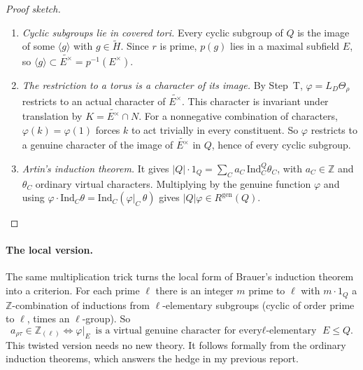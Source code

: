\documentclass[11pt]{article}
\newcommand{\tH}{\widetilde H}
\theoremstyle{plain}
\begin{document}
\begin{proof}[Proof sketch]
\begin{enumerate}[label=(\roman*)]
\item \emph{Cyclic subgroups lie in covered tori.} Every cyclic subgroup
of $Q$ is the image of some $\langle g\rangle$ with $g\in\tH$. Since $r$
is prime, $p(g)$ lies in a maximal subfield $E$, so
$\langle g\rangle\subset\widetilde{E^\times}=p^{-1}(E^\times)$.
\item \emph{The restriction to a torus is a character of its image.}
By Step~T, $\varphi=L_D\Theta_\rho$ restricts to an actual character of
$\widetilde{E^\times}$. This character is invariant under translation
by $K=\widetilde{E^\times}\cap N$. For a nonnegative combination of
characters, $\varphi(k)=\varphi(1)$ forces $k$ to act trivially in
every constituent. So $\varphi$ restricts to a genuine character of the
image of $\widetilde{E^\times}$ in $Q$, hence of every cyclic subgroup.
\item \emph{Artin's induction theorem.} It gives
$|Q|\cdot1_Q=\sum_Ca_C\,\mathrm{Ind}_C^Q\theta_C$, with $a_C\in\mathbb Z$
and $\theta_C$ ordinary virtual characters. Multiplying by the genuine
function $\varphi$ and using
$\varphi\cdot\mathrm{Ind}_C\theta=\mathrm{Ind}_C(\varphi|_C\,\theta)$
gives $|Q|\varphi\in R^{\mathrm{gen}}(Q)$.
\end{enumerate}
\end{proof}

\paragraph{The local version.} The same multiplication trick turns the
local form of Brauer's induction theorem into a criterion. For each
prime $\ell$ there is an integer $m$ prime to $\ell$ with $m\cdot1_Q$ a
$\mathbb Z$-combination of inductions from $\ell$-elementary subgroups
(cyclic of order prime to $\ell$, times an $\ell$-group). So
\[
a_{\rho\tau}\in\mathbb Z_{(\ell)}
\iff
\varphi|_E\ \text{is a virtual genuine character for every
$\ell$-elementary }E\le Q.
\]
This twisted version needs no new theory. It follows formally from the
ordinary induction theorems, which answers the hedge in my previous
report.
\end{document}
